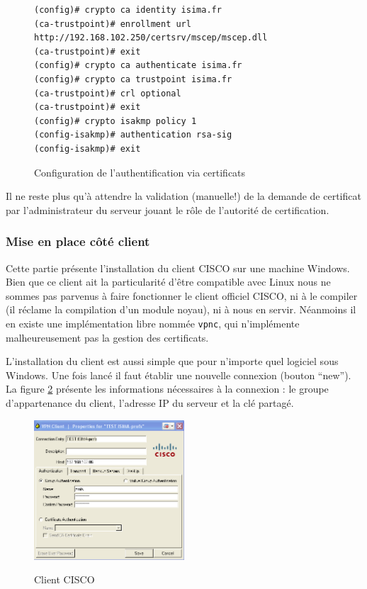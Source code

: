 \begin{figure}[H]
	\begin{center}
		\begin{minipage}{1\textwidth}
			\begin{lstlisting}[frame=trBL]
(config)# crypto ca identity isima.fr
(ca-trustpoint)# enrollment url
http://192.168.102.250/certsrv/mscep/mscep.dll
(ca-trustpoint)# exit
(config)# crypto ca authenticate isima.fr
(config)# crypto ca trustpoint isima.fr
(ca-trustpoint)# crl optional
(ca-trustpoint)# exit
(config)# crypto isakmp policy 1
(config-isakmp)# authentication rsa-sig
(config-isakmp)# exit
			\end{lstlisting}
		\end{minipage}
	\end{center}
	\caption{Configuration de l'authentification via certificats}
	\label{configuration_authentification_certificats}
\end{figure}

Il ne reste plus qu'à attendre la validation (manuelle!) de la demande de certificat par l'administrateur du serveur jouant le rôle de l'autorité de certification.

\subsubsection{Mise en place côté client}

Cette partie présente l'installation du client CISCO sur une machine Windows. Bien que ce client ait la particularité d'être compatible avec Linux nous ne sommes pas parvenus à faire fonctionner le client officiel CISCO, ni à le compiler (il réclame la compilation d'un module noyau), ni à nous en servir. Néanmoins il en existe une implémentation libre nommée \verb|vpnc|, qui n'implémente malheureusement pas la gestion des certificats.

L'installation du client est aussi simple que pour n'importe quel logiciel sous Windows. Une fois lancé il faut établir une nouvelle connexion (bouton ``new''). La figure \ref{VPN_CISCO} présente les informations nécessaires à la connexion : le groupe d'appartenance du client, l'adresse IP du serveur et la clé partagé.

\begin{figure}[H]
	\begin{center}
		\includegraphics[width=0.5\textwidth]{partie_2/screen_windows/client_cisco.png}\\
	\end{center}
	\caption{Client CISCO}
	\label{VPN_CISCO}
\end{figure}

